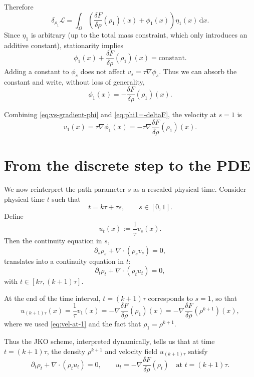 \documentclass[11pt]{article}
\numberwithin{equation}{section}
\theoremstyle{definition}
\newcommand{\dd}{\,\mathrm{d}}
\begin{document}
Therefore
\[
\delta_{\rho_1} \mathcal{L}
= \int_{\Omega}
\left(
\frac{\delta F}{\delta \rho}(\rho_1)(x) + \phi_1(x)
\right)\eta_1(x)\dd x.
\]
Since $\eta_1$ is arbitrary (up to the total mass constraint, which only introduces an additive constant), stationarity implies
\begin{equation}
\label{eq:phi1-first-variation}
\phi_1(x) + \frac{\delta F}{\delta \rho}(\rho_1)(x)
= \text{constant}.
\end{equation}
Adding a constant to $\phi_s$ does not affect $v_s = \tau \nabla\phi_s$. Thus we can absorb the constant and write, without loss of generality,
\begin{equation}
\label{eq:phi1=-deltaF}
\phi_1(x) = - \frac{\delta F}{\delta \rho}(\rho_1)(x).
\end{equation}

Combining \eqref{eq:vs-gradient-phi} and \eqref{eq:phi1=-deltaF}, the velocity at $s=1$ is
\begin{equation}
\label{eq:vel-at-1}
v_1(x)
= \tau \nabla\phi_1(x)
= - \tau \nabla \frac{\delta F}{\delta \rho}(\rho_1)(x).
\end{equation}

\section{From the discrete step to the PDE}

We now reinterpret the path parameter $s$ as a rescaled physical time. Consider physical time $t$ such that
\[
t = k\tau + \tau s,
\qquad s\in[0,1].
\]
Define
\[
u_t(x) := \frac{1}{\tau} v_s(x).
\]
Then the continuity equation in $s$,
\[
\partial_s \rho_s + \nabla\cdot(\rho_s v_s) = 0,
\]
translates into a continuity equation in $t$:
\[
\partial_t \rho_t + \nabla\cdot(\rho_t u_t) = 0,
\]
with $t\in[k\tau,(k+1)\tau]$.

At the end of the time interval, $t = (k+1)\tau$ corresponds to $s = 1$, so that
\[
u_{(k+1)\tau}(x)
= \frac{1}{\tau} v_1(x)
= -\nabla \frac{\delta F}{\delta \rho}(\rho_1)(x)
= -\nabla\frac{\delta F}{\delta \rho}(\rho^{k+1})(x),
\]
where we used \eqref{eq:vel-at-1} and the fact that $\rho_1 = \rho^{k+1}$.

Thus the JKO scheme, interpreted dynamically, tells us that at time $t=(k+1)\tau$, the density $\rho^{k+1}$ and velocity field $u_{(k+1)\tau}$ satisfy
\begin{equation}
\label{eq:JKO-continuous-approx}
\partial_t \rho_t + \nabla\cdot(\rho_t u_t) = 0,
\qquad
u_t = -\nabla\frac{\delta F}{\delta \rho}(\rho_t)
\quad\text{at } t=(k+1)\tau.
\end{equation}
\end{document}
